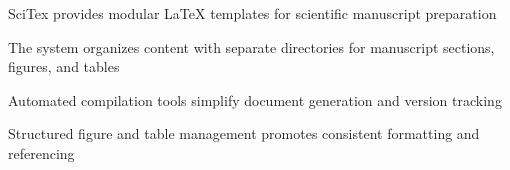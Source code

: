 
\begin{highlights}

\item SciTex provides modular LaTeX templates for scientific manuscript preparation

\item The system organizes content with separate directories for manuscript sections, figures, and tables

\item Automated compilation tools simplify document generation and version tracking

\item Structured figure and table management promotes consistent formatting and referencing

\end{highlights}


